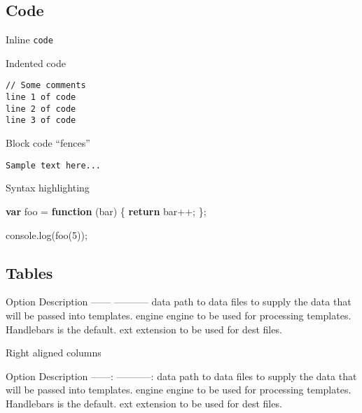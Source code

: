 \documentclass[]{article}
\newenvironment{Shaded}{}{}
\newcommand{\KeywordTok}[1]{\textcolor[rgb]{0.00,0.44,0.13}{\textbf{{#1}}}}
\newcommand{\DecValTok}[1]{\textcolor[rgb]{0.25,0.63,0.44}{{#1}}}
\newcommand{\VariableTok}[1]{\textcolor[rgb]{0.10,0.09,0.49}{{#1}}}
\newcommand{\ControlFlowTok}[1]{\textcolor[rgb]{0.00,0.44,0.13}{\textbf{{#1}}}}
\newcommand{\OperatorTok}[1]{\textcolor[rgb]{0.40,0.40,0.40}{{#1}}}
\newcommand{\AttributeTok}[1]{\textcolor[rgb]{0.49,0.56,0.16}{{#1}}}
\newcommand{\NormalTok}[1]{{#1}}
\begin{document}
\subsection{Code}

Inline \texttt{code}

Indented code

\begin{verbatim}
// Some comments
line 1 of code
line 2 of code
line 3 of code
\end{verbatim}

Block code ``fences''

\begin{verbatim}
Sample text here...
\end{verbatim}

Syntax highlighting

\begin{Shaded}
\begin{Highlighting}[]
\KeywordTok{var} \NormalTok{foo }\OperatorTok{=} \KeywordTok{function} \NormalTok{(bar) }\OperatorTok{\{}
  \ControlFlowTok{return} \NormalTok{bar}\OperatorTok{++;}
\OperatorTok{\};}

\VariableTok{console}\NormalTok{.}\AttributeTok{log}\NormalTok{(}\AttributeTok{foo}\NormalTok{(}\DecValTok{5}\NormalTok{))}\OperatorTok{;}
\end{Highlighting}
\end{Shaded}

\subsection{Tables}

\textbar{} Option \textbar{} Description \textbar{} \textbar{} ------
\textbar{} ----------- \textbar{} \textbar{} data \textbar{} path to
data files to supply the data that will be passed into templates.
\textbar{} \textbar{} engine \textbar{} engine to be used for processing
templates. Handlebars is the default. \textbar{} \textbar{} ext
\textbar{} extension to be used for dest files. \textbar{}

Right aligned columns

\textbar{} Option \textbar{} Description \textbar{} \textbar{}
------:\textbar{} -----------:\textbar{} \textbar{} data \textbar{} path
to data files to supply the data that will be passed into templates.
\textbar{} \textbar{} engine \textbar{} engine to be used for processing
templates. Handlebars is the default. \textbar{} \textbar{} ext
\textbar{} extension to be used for dest files. \textbar{}
\end{document}

